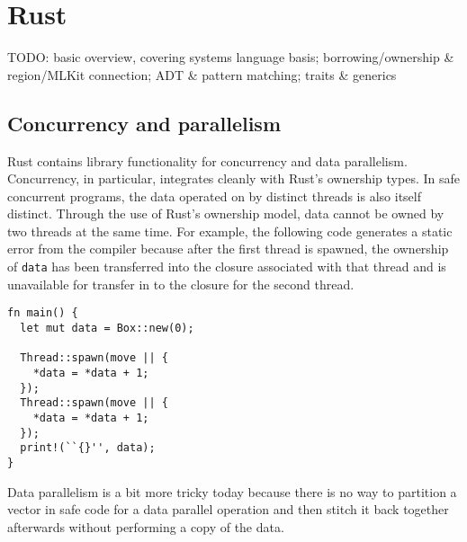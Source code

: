 
\section{Rust}
\label{sec:rust}

TODO: basic overview, covering systems language basis; borrowing/ownership \& region/MLKit connection; ADT \& pattern matching; traits \& generics


\subsection{Concurrency and parallelism}

Rust contains library functionality for concurrency and data parallelism.
Concurrency, in particular, integrates cleanly with Rust's ownership types.
In safe concurrent programs, the data operated on by distinct threads is also itself distinct.
Through the use of Rust's ownership model, data cannot be owned by two threads at the same time.
For example, the following code generates a static error from the compiler because after the first
thread is spawned, the ownership of \lstinline{data} has been transferred into the closure associated
with that thread and is unavailable for transfer in to the closure for the second thread.
\begin{lstlisting}
fn main() {
  let mut data = Box::new(0);

  Thread::spawn(move || {
    *data = *data + 1;
  });
  Thread::spawn(move || {
    *data = *data + 1;
  });
  print!(``{}'', data);
}
\end{lstlisting}

Data parallelism is a bit more tricky today because there is no way to \eg{} partition a vector in safe code
for a data parallel operation and then stitch it back together afterwards without performing a copy of the data.

